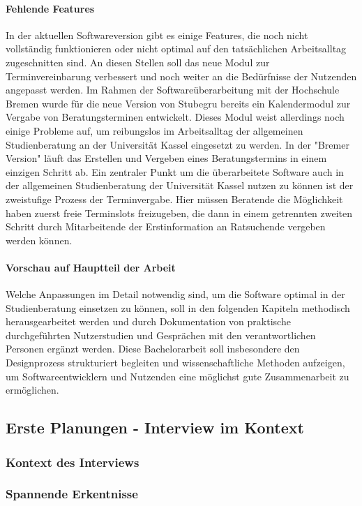 \documentclass[12pt]{article}
\begin{document}
\paragraph{Fehlende Features}
In der aktuellen Softwareversion gibt es einige Features, die noch nicht
vollständig funktionieren oder nicht optimal auf den tatsächlichen
Arbeitsalltag zugeschnitten sind. An diesen Stellen soll das neue Modul zur
Terminvereinbarung verbessert und noch weiter an die Bedürfnisse der Nutzenden
angepasst werden. Im Rahmen der Softwareüberarbeitung mit der Hochschule Bremen
wurde für die neue Version von Stubegru bereits ein Kalendermodul zur Vergabe
von Beratungsterminen entwickelt. Dieses Modul weist allerdings noch einige
Probleme auf, um reibungslos im Arbeitsalltag der allgemeinen Studienberatung
an der Universität Kassel eingesetzt zu werden. In der "Bremer Version" läuft
das Erstellen und Vergeben eines Beratungstermins in einem einzigen Schritt ab.
Ein zentraler Punkt um die überarbeitete Software auch in der allgemeinen
Studienberatung der Universität Kassel nutzen zu können ist der zweistufige
Prozess der Terminvergabe. Hier müssen Beratende die Möglichkeit haben zuerst
freie Terminslots freizugeben, die dann in einem getrennten zweiten Schritt
durch Mitarbeitende der Erstinformation an Ratsuchende vergeben werden können.

\paragraph{Vorschau auf Hauptteil der Arbeit}
Welche Anpassungen im Detail notwendig sind, um die Software optimal in der
Studienberatung einsetzen zu können, soll in den folgenden Kapiteln methodisch
herausgearbeitet werden und durch Dokumentation von praktische durchgeführten
Nutzerstudien und Gesprächen mit den verantwortlichen Personen ergänzt werden.
Diese Bachelorarbeit soll insbesondere den Designprozess strukturiert begleiten
und wissenschaftliche Methoden aufzeigen, um Softwareentwicklern und Nutzenden
eine möglichst gute Zusammenarbeit zu ermöglichen.

\subsection{Erste Planungen - Interview im Kontext}
\subsubsection{Kontext des Interviews}
\subsubsection{Spannende Erkentnisse}
\end{document}
